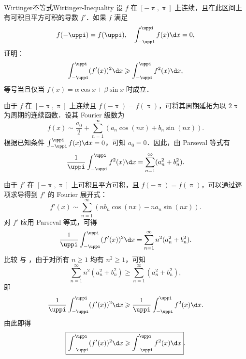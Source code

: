 \begin{problem}{Wirtinger不等式}{Wirtinger-Inequality}
    设 $f$ 在 $[-\uppi, \uppi]$ 上连续，且在此区间上有可积且平方可积的导数 $f'$．如果 $f$ 满足
    \begin{equation}
        f(-\uppi) = f(\uppi), \quad \int_{-\uppi}^{\uppi} f(x) \d x = 0,
    \end{equation}
    证明：
    \begin{equation}
        \int_{-\uppi}^{\uppi} (f'(x))^2 \d x \geqslant \int_{-\uppi}^{\uppi} f^2(x) \d x,
    \end{equation}
    等号当且仅当 $f(x) = \alpha \cos x + \beta \sin x$ 时成立．
\end{problem}

\begin{myproof}
    由于 $f$ 在 $[-\uppi, \uppi]$ 上连续且 $f(-\uppi) = f(\uppi)$，可将其周期延拓为以 $2\uppi$ 为周期的连续函数．设其 Fourier 级数为
    \begin{equation}\label{eq:f-fourier-8}
        f(x) \sim \frac{a_0}{2} + \sum_{n=1}^{\infty} (a_n \cos(nx) + b_n \sin(nx)).
    \end{equation}
    根据已知条件 $\int_{-\uppi}^{\uppi} f(x) \d x = 0$，可知 $a_0 = 0$．因此，由 Parseval 等式有
    \begin{equation}\label{eq:f-parseval-8}
        \frac{1}{\uppi} \int_{-\uppi}^{\uppi} f^2(x) \d x = \sum_{n=1}^{\infty} (a_n^2 + b_n^2).
    \end{equation}

    由于 $f'$ 在 $[-\uppi, \uppi]$ 上可积且平方可积，且 $f(-\uppi) = f(\uppi)$，可以通过逐项求导得到 $f'$ 的 Fourier 展开式：
    \begin{equation}
        f'(x) \sim \sum_{n=1}^{\infty} (n b_n \cos(nx) - n a_n \sin(nx)).
    \end{equation}
    对 $f'$ 应用 Parseval 等式，可得
    \begin{equation}\label{eq:fprime-parseval-8}
        \frac{1}{\uppi} \int_{-\uppi}^{\uppi} (f'(x))^2 \d x = \sum_{n=1}^{\infty} n^2 (a_n^2 + b_n^2).
    \end{equation}
    比较  与 ，由于对所有 $n \geqslant 1$ 均有 $n^2 \geqslant 1$，可知
    \begin{equation}
        \sum_{n=1}^{\infty} n^2 (a_n^2 + b_n^2) \geqslant \sum_{n=1}^{\infty} (a_n^2 + b_n^2),
    \end{equation}
    即
    \begin{equation}
        \frac{1}{\uppi} \int_{-\uppi}^{\uppi} (f'(x))^2 \d x \geqslant \frac{1}{\uppi} \int_{-\uppi}^{\uppi} f^2(x) \d x.
    \end{equation}
    由此即得
    \begin{equation}
        \boxed{\int_{-\uppi}^{\uppi} (f'(x))^2 \d x \geqslant \int_{-\uppi}^{\uppi} f^2(x) \d x}.
    \end{equation}


\end{myproof}
